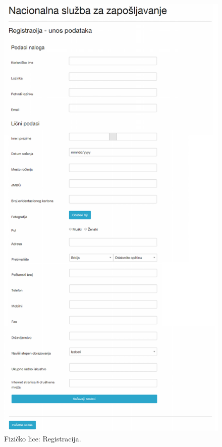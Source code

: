 \begin{figure}[H]
	\centering
	\includegraphics[height=0.95\textheight]{korisnicki-interfejs/slike/fl-registracija.png}
	\caption{Fizi\v cko lice: Registracija.}
	\label{for: fl-registracija}
\end{figure}

